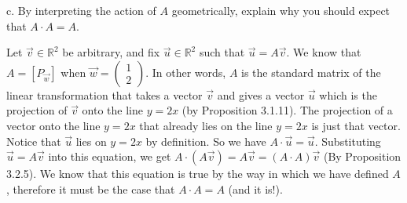 \documentclass[12pt]{article}
\newenvironment{problem}[2][Problem]
{
	\begin{trivlist} 
		\item[\hskip \labelsep {\bfseries #1 #2:}]
	}
{
	\end{trivlist}
	}
\newenvironment{solution}[1][Solution]
{
	\begin{trivlist} 
		\item[\hskip \labelsep {\itshape #1:}]
	}
	{
	\end{trivlist}
}
\begin{document}
\begin{problem}{2}
\noindent
\newline
\newline
c. By interpreting the action of $A$ geometrically, explain why you should expect that $A \cdot A =A$.
\begin{solution}
Let $\vec{v} \in \mathbb{R}^2$ be arbitrary, and fix $\vec{u} \in \mathbb{R}^2$ such that $\vec{u} = A\vec{v}$. We know that $A=[P_{\vec{w}}]$ when $\vec{w}= \begin{pmatrix} 1\\2\end{pmatrix}$. In other words, $A$ is the standard matrix of the linear transformation that takes a vector $\vec{v}$ and gives a vector $\vec{u}$ which is the projection of $\vec{v}$ onto the line $y=2x$ (by Proposition 3.1.11). The projection of a vector onto the line $y=2x$ that already lies on the line $y=2x$ is just that vector. Notice that $\vec{u}$ lies on $y=2x$ by definition. So we have $A\cdot \vec{u} = \vec{u}$. Substituting  $\vec{u} = A\vec{v}$ into this equation, we get $A\cdot(A\vec{v})=A\vec{v}=(A\cdot A)\vec{v}$ (By Proposition 3.2.5). We know that this equation is true by the way in which we have defined $A$, therefore it must be the case that $A \cdot A =A$ (and it is!). 
\end{solution}
\end{problem}
\end{document}

